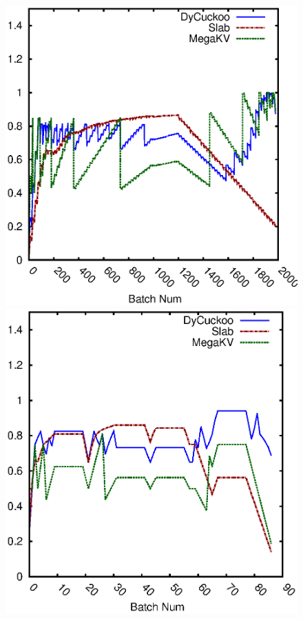 \begin{figure}[htp]
\begin{minipage}{0.19\linewidth}
		\centerline{\dsreddit}
	\end{minipage}
	\begin{minipage}{0.19\linewidth}\centering
		\includegraphics[width=\linewidth]{pic/dynamic-load_factor/tpch/batch_LoadFactor-2.eps}
		\centerline{\dstpch}
	\end{minipage}
	\begin{minipage}{0.19\linewidth}\centering
		\includegraphics[width=\linewidth]{pic/dynamic-load_factor/ali/batch_LoadFactor-2.eps}

\end{minipage}
\end{figure}
